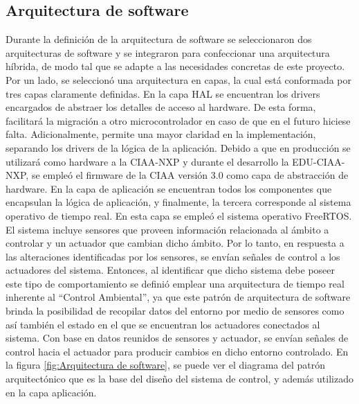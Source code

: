 \subsection{Arquitectura de software}
\label{subsec:Arquitectura de software}

Durante la definición de la arquitectura de software se seleccionaron dos arquitecturas de software y se integraron para confeccionar una arquitectura híbrida, de modo tal que se adapte a las necesidades concretas de este proyecto. Por un lado, se seleccionó una arquitectura en capas, la cual está conformada por tres capas claramente definidas.
En la capa HAL se encuentran los drivers encargados de abstraer los detalles de acceso al hardware. De esta forma, facilitará la migración a otro microcontrolador en caso de que en el futuro hiciese falta. Adicionalmente, permite una mayor claridad en la implementación, separando los drivers de la lógica de la aplicación.
Debido a que en producción se utilizará como hardware a la CIAA-NXP y durante el desarrollo la EDU-CIAA-NXP, se empleó el firmware de la CIAA versión 3.0 como capa de abstracción de hardware. 
En la capa de aplicación se encuentran todos los componentes que encapsulan la lógica de aplicación, y finalmente, la tercera corresponde al sistema operativo de tiempo real. En esta capa se empleó el sistema operativo FreeRTOS.
El sistema incluye sensores que proveen información relacionada al ámbito a controlar y un actuador que cambian dicho ámbito. Por lo tanto, en respuesta a las alteraciones identificadas por los sensores, se envían señales de control a los actuadores del sistema. Entonces, al identificar que dicho sistema debe poseer este tipo de comportamiento se definió emplear una arquitectura de tiempo real inherente al “Control Ambiental”, ya que este patrón de arquitectura de software brinda la posibilidad de recopilar datos del entorno por medio de sensores como así también el estado en el que se encuentran los actuadores  conectados al sistema. Con base en datos reunidos de sensores y actuador, se envían señales de control hacia el actuador para producir cambios en dicho entorno controlado. En la figura \ref{fig:Arquitectura de software}, se puede ver el diagrama del patrón arquitectónico que es la base del diseño del sistema de control, y además utilizado en la capa aplicación. 

